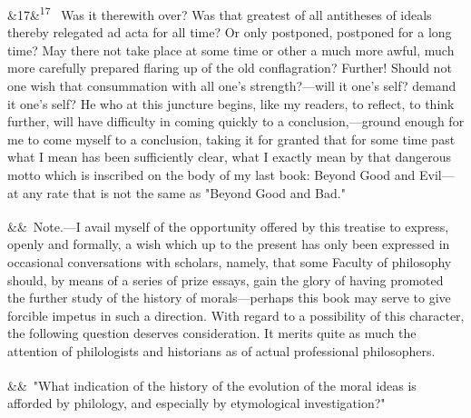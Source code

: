 \documentclass[12pt]{article}
\newcommand{\para}[1][]{\par\noindent\ifx&#1&\else\textsuperscript{\footnotesize #1}~\fi}
\begin{document}
\para[17] Was it therewith over? Was that greatest of all antitheses of ideals thereby relegated ad acta for all time? Or only postponed, postponed for a long time? May there not take place at some time or other a much more awful, much more carefully prepared flaring up of the old conflagration? Further! Should not one wish that consummation with all one's strength?---will it one's self? demand it one's self? He who at this juncture begins, like my readers, to reflect, to think further, will have difficulty in coming quickly to a conclusion,---ground enough for me to come myself to a conclusion, taking it for granted that for some time past what I mean has been sufficiently clear, what I exactly mean by that dangerous motto which is inscribed on the body of my last book: Beyond Good and Evil---at any rate that is not the same as "Beyond Good and Bad."

\para Note.---I avail myself of the opportunity offered by this treatise to express, openly and formally, a wish which up to the present has only been expressed in occasional conversations with scholars, namely, that some Faculty of philosophy should, by means of a series of prize essays, gain the glory of having promoted the further study of the history of morals---perhaps this book may serve to give forcible impetus in such a direction. With regard to a possibility of this character, the following question deserves consideration. It merits quite as much the attention of philologists and historians as of actual professional philosophers.

\para "What indication of the history of the evolution of the moral ideas is afforded by philology, and especially by etymological investigation?"
\end{document}
